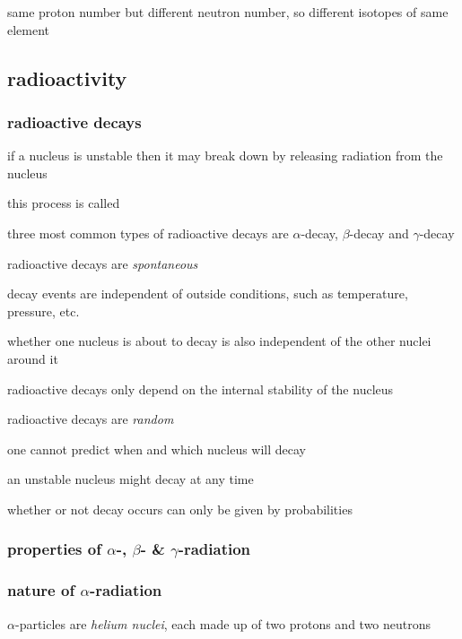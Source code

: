same proton number but different neutron number, so different isotopes of same element \eoe




\subsection{radioactivity}

\subsubsection{radioactive decays}

if a nucleus is unstable then it may break down by releasing radiation from the nucleus

this process is called 

\cmt three most common types of radioactive decays are $\alpha$-decay, $\beta$-decay and $\gamma$-decay

\cmt radioactive decays are \emph{spontaneous}

decay events are independent of outside conditions, such as temperature, pressure, etc.

whether one nucleus is about to decay is also independent of the other nuclei around it

radioactive decays only depend on the internal stability of the nucleus

\cmt radioactive decays are \emph{random}

one cannot predict when and which nucleus will decay

an unstable nucleus might decay at any time

whether or not decay occurs can only be given by probabilities





\subsubsection{properties of \texorpdfstring{$\alpha$}{\textalpha}-, \texorpdfstring{$\beta$}{\textbeta}- \& \texorpdfstring{$\gamma$}{\textgamma}-radiation}

\subsubsection*{nature of \texorpdfstring{$\alpha$}{\textalpha}-radiation}

$\alpha$-particles are \emph{helium nuclei}, each made up of two protons and two neutrons

